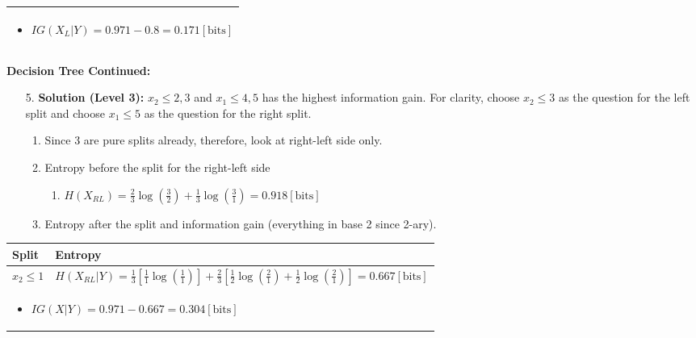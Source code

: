 \begin{example}
\begin{center}
\begin{tabular}{ll}
            \multicolumn{2}{p{\linewidth}}{
            \begin{itemize}
                \item $IG(X_{L}|Y) = 0.971 - 0.8 = 0.171 [\text{bits}]$
            \end{itemize}} \\
            \bottomrule
        \end{tabular}
    \end{center}
\end{example}
\newpage

\begin{example} \textbf{Decision Tree Continued:}
    \begin{enumerate}
        \item[5.] \textbf{Solution (Level 3):} $x_2 \leq 2,3$ and $x_1 \leq 4,5$ has the highest information gain. For clarity, choose \(x_2 \leq 3\) as the question for the left split and choose \(x_1 \leq 5\) as the question for the right split.
        \begin{enumerate}
            \item Since 3 are pure splits already, therefore, look at right-left side only.
            \item Entropy before the split for the right-left side
            \begin{enumerate}
                \item $H(X_{RL}) = \frac{2}{3} \log\left(\frac{3}{2}\right) + \frac{1}{3} \log\left(\frac{3}{1}\right) = 0.918 [\text{bits}]$
            \end{enumerate}
            \item Entropy after the split and information gain (everything in base 2 since 2-ary).
        \end{enumerate}
    \end{enumerate}
    \begin{center}
        \begin{tabular}{ll}
            \textbf{Split} & \textbf{Entropy} \\
            \toprule
            \(x_2 \leq 1\) & $H(X_{RL} | Y) = \frac{1}{3} \left[\frac{1}{1} \log \left(\frac{1}{1}\right) \right] + \frac{2}{3} \left[\frac{1}{2} \log \left(\frac{2}{1}\right) + \frac{1}{2} \log \left(\frac{2}{1}\right) \right] = 0.667 [\text{bits}]$ \\
            \multicolumn{2}{p{\linewidth}}{
            \begin{itemize}
                \item $IG(X|Y) = 0.971 - 0.667 = 0.304 [\text{bits}]$

\end{itemize}}
\end{tabular}
\end{center}
\end{example}
